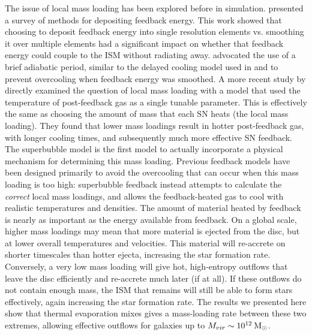 The issue of local mass loading has been explored before in simulation.
\citet{Thacker2000} presented a survey of methods for depositing feedback
energy.  This work showed that choosing to deposit feedback energy into single
resolution elements vs. smoothing it over multiple elements had a significant
impact on whether that feedback energy could couple to the ISM without radiating
away.  \citet{Thacker2000} advocated the use of a brief adiabatic period,
similar to the delayed cooling model used in \citet{Stinson2006} and
\citet{Rosdahl2016} to prevent overcooling when feedback energy was smoothed.  A
more recent study by \citet{DallaVecchia2012} directly examined the question of
local mass loading with a model that used the temperature of post-feedback
gas as a single tunable parameter.  This is effectively the same as choosing
the amount of mass that each SN heats (the local mass loading).
They found that lower mass loadings result in hotter post-feedback gas, with
longer cooling times, and subsequently much more effective SN feedback.
The \citet{Keller2014} superbubble model is the first model to actually
incorporate a physical mechanism for determining this mass loading.  Previous
feedback models have been designed primarily to avoid the overcooling that can
occur when this mass loading is too high: superbubble feedback instead attempts
to calculate the {\it correct} local mass loadings, and allows the
feedback-heated gas to cool with realistic temperatures and densities.  The
amount of material heated by feedback is nearly as important as the energy
available from feedback.  On a global scale, higher mass loadings may mean that
more material is ejected from the disc, but at lower overall temperatures and
velocities.  This material will re-accrete on shorter timescales than hotter
ejecta, increasing the star formation rate.  Conversely, a very low mass loading
will give hot, high-entropy outflows that leave the disc efficiently and
re-accrete much later (if at all).  If these outflows do not contain enough
mass, the ISM that remains will still be able to form stars effectively, again
increasing the star formation rate.  The results we presented here show that
thermal evaporation mixes gives a mass-loading rate between these two extremes,
allowing effective outflows for galaxies up to $M_{vir}\sim10^{12}\>{\rm M_{\odot}}$.

